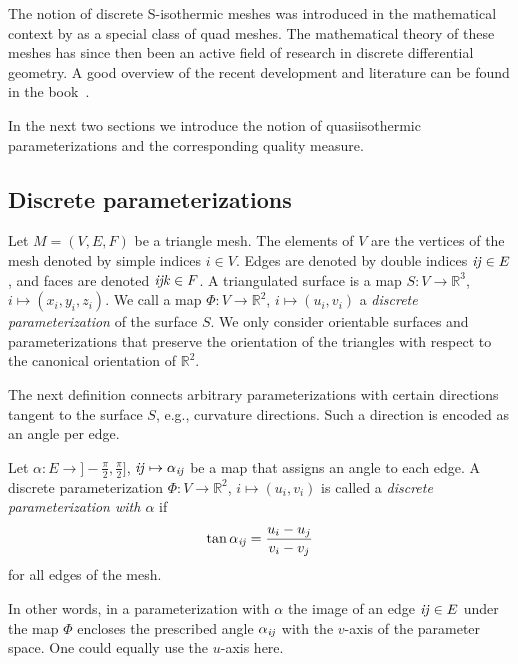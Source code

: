 The notion of discrete S-isothermic meshes was introduced in the mathematical
context by \cite{BobenkoP1996} as a special class of quad meshes.
The mathematical theory of these meshes has since then been an active field of
research in discrete differential geometry. A good overview of the recent
development and literature can be found in the book~\cite{BobenkoSuris2008}. 


In the next two sections we introduce the notion of quasiisothermic parameterizations and the
corresponding quality measure.

\subsection{Discrete parameterizations}
Let $M=(V,E,F)$ be a triangle mesh. The elements of $V$ are the vertices of the
mesh denoted by simple indices $i\in V$. Edges are denoted by double
indices $\mathrm{\it{ij}}\in E$, and faces are denoted $\mathrm{\it{ijk}}\in F$. A triangulated surface is
a map $S:V\to \mathbb R^3$, $i \mapsto (x_i, y_i, z_i)$.
We call a map $\Phi: V \to \mathbb R^2$, $i \mapsto (u_i,v_i)$ a \emph{discrete
parameterization} of the surface $S$. We only consider orientable surfaces and
parameterizations that preserve the orientation of the triangles with respect to
the canonical orientation of $\mathbb R^2$. 

The next definition connects arbitrary parameterizations with certain directions
tangent to the surface $S$, e.g., curvature directions. Such a direction is encoded as 
an angle per edge. 
\begin{definition}
Let $\alpha : E \to ]-\frac{\pi}{2},\frac{\pi}{2}]$, $\mathrm{\it{ij}} \mapsto \alpha_{\mathrm{\it{ij}}}$
be a map that assigns an angle to each edge. A discrete parameterization 
$\Phi: V\to \mathbb R^2$, $i \mapsto (u_i,v_i)$ is called a \emph{discrete
parameterization with $\alpha$} if
\begin{equation}
\label{eq:isothermic}
\tan \alpha_{\mathrm{\it{ij}}} = \frac{u_i - u_j}{v_i - v_j}
\end{equation}
for all edges of the mesh.
\end{definition}
In other words, in a parameterization with $\alpha$ the image of an edge $\mathrm{\it{ij}}\in
E$ under the map $\Phi$ encloses the prescribed angle $\alpha_{\mathrm{\it{ij}}}$ with the
$v$-axis of the parameter space. One could equally use the $u$-axis here.

